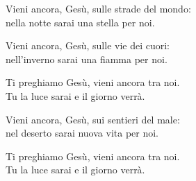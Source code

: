 
\strofa Vieni ancora, Gesù, sulle strade del mondo:\\
nella notte sarai una stella per noi.

\spazio


\spazio

\strofa Vieni ancora, Gesù, sulle vie dei cuori:\\
nell'inverno sarai una fiamma per noi.

\spazio


\spazio

\strofa Ti preghiamo Gesù, vieni ancora tra noi.\\
Tu la luce sarai e il giorno verrà.

\spazio


\spazio

\strofa Vieni ancora, Gesù, sui sentieri del male:\\
nel deserto sarai nuova vita per noi.

\spazio


\spazio

\strofa Ti preghiamo Gesù, vieni ancora tra noi.\\
Tu la luce sarai e il giorno verrà.

\spazio

